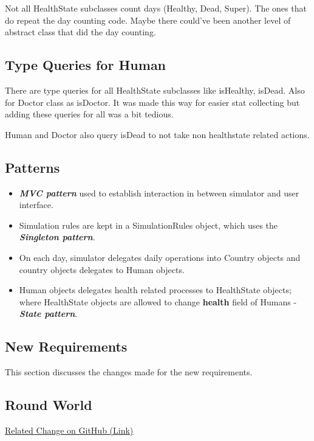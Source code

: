 \documentclass[]{article}
\providecommand{\tightlist}{%
  \setlength{\itemsep}{0pt}\setlength{\parskip}{0pt}}
\begin{document}
Not all HealthState subclasses count days (Healthy, Dead, Super). The
ones that do repeat the day counting code. Maybe there could've been
another level of abstract class that did the day counting.

\subsection{Type Queries for Human}\label{type-queries-for-human}

There are type queries for all HealthState subclasses like isHealthy,
isDead. Also for Doctor class as isDoctor. It was made this way for
easier stat collecting but adding these queries for all was a bit
tedious.

Human and Doctor also query isDead to not take non healthstate related
actions.

\subsection{Patterns}\label{patterns}

\begin{itemize}
\tightlist
\item
  \textbf{\emph{MVC pattern}} used to establish interaction in between
  simulator and user interface.
\item
  Simulation rules are kept in a SimulationRules object, which uses the
  \textbf{\emph{Singleton pattern}}.
\item
  On each day, simulator delegates daily operations into Country objects
  and country objects delegates to Human objects.
\item
  Human objects delegates health related processes to HealthState
  objects; where HealthState objects are allowed to change
  \textbf{health} field of Humans -\textbf{\emph{State pattern}}.
\end{itemize}

\subsection{New Requirements}\label{new-requirements}

This section discusses the changes made for the new requirements.

\subsection{Round World}\label{round-world}

\href{https://github.com/ozusrl/CS534-kivanccakmak-okanpalaz/commit/824cb1fdc5306ff98c4ce2375f623f892dedcf70}{Related
Change on GitHub (Link)}
\end{document}
